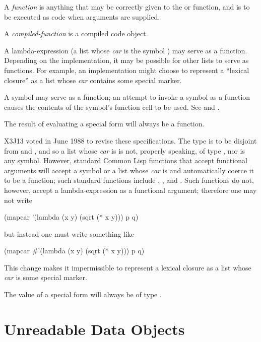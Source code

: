 {\begin{obsolete}
A {\it function} is anything that may be correctly given to the 
or  function, and is
to be executed as code when arguments are supplied.

A {\it compiled-function} is a compiled code object.

A lambda-expression
(a list whose {\it car} is the symbol ) may serve as a function.
Depending on the implementation, it may be possible for other lists to
serve as functions.  For example, an implementation might choose to
represent a ``lexical closure'' as a list whose {\it car} contains some
special marker.

A symbol may serve as a function; an attempt to invoke a symbol as a function
causes the contents of the symbol's function cell to be used.
See  and .

The result of evaluating a  special form
will always be a function.
\end{obsolete}

\begin{newer}
X3J13 voted in June 1988 
to revise these specifications.  The type  is to be disjoint
from  and , and so a list whose {\it car} is 
is not, properly speaking, of type , nor is any symbol.
However,
standard Common Lisp functions that accept functional arguments
will accept a symbol or a list whose {\it car} is 
and automatically coerce it to be a function; such standard
functions include , , and .
Such functions do not, however, accept a lambda-expression as a functional
argument; therefore one may not write

\vskip 3pt
\begin{lisp}
(mapcar '(lambda (x y) (sqrt (* x y))) p q)
\end{lisp}
but instead one must write something like
\begin{lisp}
(mapcar \#'(lambda (x y) (sqrt (* x y))) p q)
\end{lisp}

This change makes it impermissible to represent a lexical closure
as a list whose {\it car} is some special marker.

The value of a  special form
will always be of type .
\end{newer}

\section{Unreadable Data Objects}

}
